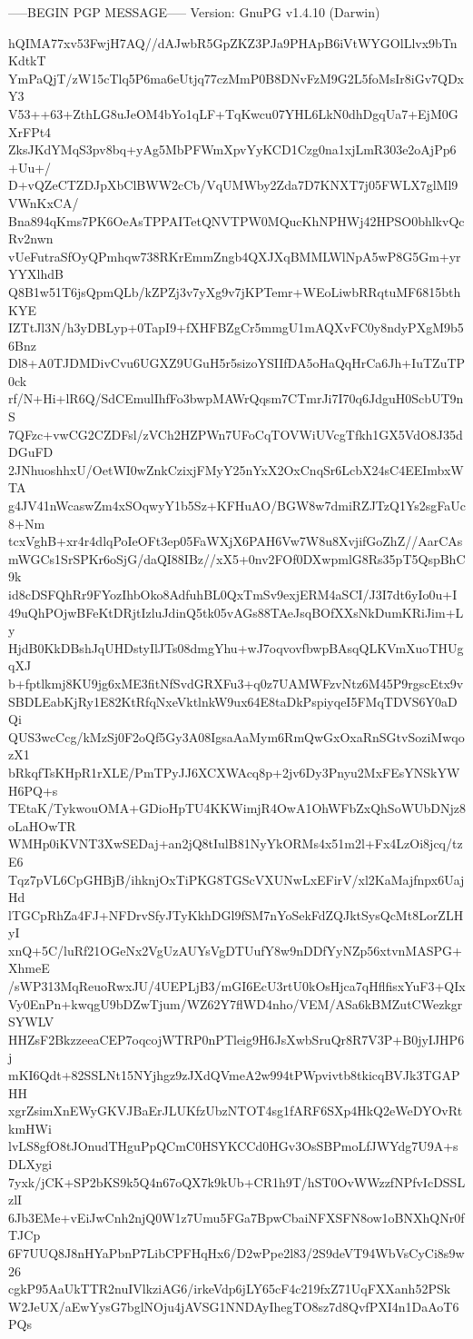-----BEGIN PGP MESSAGE-----
Version: GnuPG v1.4.10 (Darwin)

hQIMA77xv53FwjH7AQ//dAJwbR5GpZKZ3PJa9PHApB6iVtWYGOlLlvx9bTnKdtkT
YmPaQjT/zW15cTlq5P6ma6eUtjq77czMmP0B8DNvFzM9G2L5foMsIr8iGv7QDxY3
V53++63+ZthLG8uJeOM4bYo1qLF+TqKwcu07YHL6LkN0dhDgqUa7+EjM0GXrFPt4
ZksJKdYMqS3pv8bq+yAg5MbPFWmXpvYyKCD1Czg0na1xjLmR303e2oAjPp6+Uu+/
D+vQZeCTZDJpXbClBWW2cCb/VqUMWby2Zda7D7KNXT7j05FWLX7glMl9VWnKxCA/
Bna894qKms7PK6OeAsTPPAITetQNVTPW0MQucKhNPHWj42HPSO0bhlkvQcRv2nwn
vUeFutraSfOyQPmhqw738RKrEmmZngb4QXJXqBMMLWlNpA5wP8G5Gm+yrYYXlhdB
Q8B1w51T6jsQpmQLb/kZPZj3v7yXg9v7jKPTemr+WEoLiwbRRqtuMF6815bthKYE
IZTtJl3N/h3yDBLyp+0TapI9+fXHFBZgCr5mmgU1mAQXvFC0y8ndyPXgM9b56Bnz
Dl8+A0TJDMDivCvu6UGXZ9UGuH5r5sizoYSIIfDA5oHaQqHrCa6Jh+IuTZuTP0ck
rf/N+Hi+lR6Q/SdCEmulIhfFo3bwpMAWrQqsm7CTmrJi7I70q6JdguH0ScbUT9nS
7QFzc+vwCG2CZDFsl/zVCh2HZPWn7UFoCqTOVWiUVcgTfkh1GX5VdO8J35dDGuFD
2JNhuoshhxU/OetWI0wZnkCzixjFMyY25nYxX2OxCnqSr6LcbX24sC4EEImbxWTA
g4JV41nWcaswZm4xSOqwyY1b5Sz+KFHuAO/BGW8w7dmiRZJTzQ1Ys2sgFaUc8+Nm
tcxVghB+xr4r4dlqPoIeOFt3ep05FaWXjX6PAH6Vw7W8u8XvjifGoZhZ//AarCAs
mWGCs1SrSPKr6oSjG/daQI88IBz//xX5+0nv2FOf0DXwpmlG8Rs35pT5QspBhC9k
id8cDSFQhRr9FYozIhbOko8AdfuhBL0QxTmSv9exjERM4aSCI/J3I7dt6yIo0u+I
49uQhPOjwBFeKtDRjtIzluJdinQ5tk05vAGs88TAeJsqBOfXXsNkDumKRiJim+Ly
HjdB0KkDBshJqUHDstyIlJTs08dmgYhu+wJ7oqvovfbwpBAsqQLKVmXuoTHUgqXJ
b+fptlkmj8KU9jg6xME3fitNfSvdGRXFu3+q0z7UAMWFzvNtz6M45P9rgscEtx9v
SBDLEabKjRy1E82KtRfqNxeVktlnkW9ux64E8taDkPspiyqeI5FMqTDVS6Y0aDQi
QUS3wcCcg/kMzSj0F2oQf5Gy3A08IgsaAaMym6RmQwGxOxaRnSGtvSoziMwqozX1
bRkqfTsKHpR1rXLE/PmTPyJJ6XCXWAcq8p+2jv6Dy3Pnyu2MxFEsYNSkYWH6PQ+s
TEtaK/TykwouOMA+GDioHpTU4KKWimjR4OwA1OhWFbZxQhSoWUbDNjz8oLaHOwTR
WMHp0iKVNT3XwSEDaj+an2jQ8tIulB81NyYkORMs4x51m2l+Fx4LzOi8jcq/tzE6
Tqz7pVL6CpGHBjB/ihknjOxTiPKG8TGScVXUNwLxEFirV/xl2KaMajfnpx6UajHd
lTGCpRhZa4FJ+NFDrvSfyJTyKkhDGl9fSM7nYoSekFdZQJktSysQcMt8LorZLHyI
xnQ+5C/luRf21OGeNx2VgUzAUYsVgDTUufY8w9nDDfYyNZp56xtvnMASPG+XhmeE
/sWP313MqReuoRwxJU/4UEPLjB3/mGI6EcU3rtU0kOsHjca7qHflfisxYuF3+QIx
Vy0EnPn+kwqgU9bDZwTjum/WZ62Y7flWD4nho/VEM/ASa6kBMZutCWezkgrSYWLV
HHZsF2BkzzeeaCEP7oqcojWTRP0nPTleig9H6JsXwbSruQr8R7V3P+B0jyIJHP6j
mKI6Qdt+82SSLNt15NYjhgz9zJXdQVmeA2w994tPWpvivtb8tkicqBVJk3TGAPHH
xgrZsimXnEWyGKVJBaErJLUKfzUbzNTOT4sg1fARF6SXp4HkQ2eWeDYOvRtkmHWi
lvLS8gfO8tJOnudTHguPpQCmC0HSYKCCd0HGv3OsSBPmoLfJWYdg7U9A+sDLXygi
7yxk/jCK+SP2bKS9k5Q4n67oQX7k9kUb+CR1h9T/hST0OvWWzzfNPfvIcDSSLzlI
6Jb3EMe+vEiJwCnh2njQ0W1z7Umu5FGa7BpwCbaiNFXSFN8ow1oBNXhQNr0fTJCp
6F7UUQ8J8nHYaPbnP7LibCPFHqHx6/D2wPpe2l83/2S9deVT94WbVsCyCi8s9w26
cgkP95AaUkTTR2nuIVlkziAG6/irkeVdp6jLY65cF4c219fxZ71UqFXXanh52PSk
W2JeUX/aEwYysG7bglNOju4jAVSG1NNDAyIhegTO8sz7d8QvfPXI4n1DaAoT6PQs
